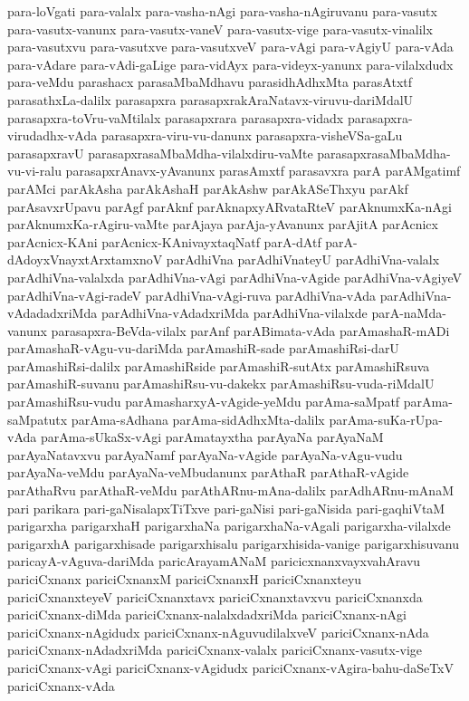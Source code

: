 {para-loVgati
para-valalx
para-vasha-nAgi
para-vasha-nAgiruvanu
para-vasutx
para-vasutx-vanunx
para-vasutx-vaneV
para-vasutx-vige
para-vasutx-vinalilx
para-vasutxvu
para-vasutxve
para-vasutxveV
para-vAgi
para-vAgiyU
para-vAda
para-vAdare
para-vAdi-gaLige
para-vidAyx
para-videyx-yanunx
para-vilalxdudx
para-veMdu
parashacx
parasaMbaMdhavu
parasidhAdhxMta
parasAtxtf
parasathxLa-dalilx
parasapxra
parasapxrakAraNatavx-viruvu-dariMdalU
parasapxra-toVru-vaMtilalx
parasapxrara
parasapxra-vidadx
parasapxra-virudadhx-vAda
parasapxra-viru-vu-danunx
parasapxra-visheVSa-gaLu
parasapxravU
parasapxrasaMbaMdha-vilalxdiru-vaMte
parasapxrasaMbaMdha-vu-vi-ralu
parasapxrAnavx-yAvanunx
parasAmxtf
parasavxra
parA
parAMgatimf
parAMci
parAkAsha
parAkAshaH
parAkAshw
parAkASeThxyu
parAkf
parAsavxrUpavu
parAgf
parAknf
parAknapxyARvataRteV
parAknumxKa-nAgi
parAknumxKa-rAgiru-vaMte
parAjaya
parAja-yAvanunx
parAjitA
parAcnicx
parAcnicx-KAni
parAcnicx-KAnivayxtaqNatf
parA-dAtf
parA-dAdoyxVnayxtArxtamxnoV
parAdhiVna
parAdhiVnateyU
parAdhiVna-valalx
parAdhiVna-valalxda
parAdhiVna-vAgi
parAdhiVna-vAgide
parAdhiVna-vAgiyeV
parAdhiVna-vAgi-radeV
parAdhiVna-vAgi-ruva
parAdhiVna-vAda
parAdhiVna-vAdadadxriMda
parAdhiVna-vAdadxriMda
parAdhiVna-vilalxde
parA-naMda-vanunx
parasapxra-BeVda-vilalx
parAnf
parABimata-vAda
parAmashaR-mADi
parAmashaR-vAgu-vu-dariMda
parAmashiR-sade
parAmashiRsi-darU
parAmashiRsi-dalilx
parAmashiRside
parAmashiR-sutAtx
parAmashiRsuva
parAmashiR-suvanu
parAmashiRsu-vu-dakekx
parAmashiRsu-vuda-riMdalU
parAmashiRsu-vudu
parAmasharxyA-vAgide-yeMdu
parAma-saMpatf
parAma-saMpatutx
parAma-sAdhana
parAma-sidAdhxMta-dalilx
parAma-suKa-rUpa-vAda
parAma-sUkaSx-vAgi
parAmatayxtha
parAyaNa
parAyaNaM
parAyaNatavxvu
parAyaNamf
parAyaNa-vAgide
parAyaNa-vAgu-vudu
parAyaNa-veMdu
parAyaNa-veMbudanunx
parAthaR
parAthaR-vAgide
parAthaRvu
parAthaR-veMdu
parAthARnu-mAna-dalilx
parAdhARnu-mAnaM
pari
parikara
pari-gaNisalapxTiTxve
pari-gaNisi
pari-gaNisida
pari-gaqhiVtaM
parigarxha
parigarxhaH
parigarxhaNa
parigarxhaNa-vAgali
parigarxha-vilalxde
parigarxhA
parigarxhisade
parigarxhisalu
parigarxhisida-vanige
parigarxhisuvanu
paricayA-vAguva-dariMda
paricArayamANaM
paricicxnanxvayxvahAravu
pariciCxnanx
pariciCxnanxM
pariciCxnanxH
pariciCxnanxteyu
pariciCxnanxteyeV
pariciCxnanxtavx
pariciCxnanxtavxvu
pariciCxnanxda
pariciCxnanx-diMda
pariciCxnanx-nalalxdadxriMda
pariciCxnanx-nAgi
pariciCxnanx-nAgidudx
pariciCxnanx-nAguvudilalxveV
pariciCxnanx-nAda
pariciCxnanx-nAdadxriMda
pariciCxnanx-valalx
pariciCxnanx-vasutx-vige
pariciCxnanx-vAgi
pariciCxnanx-vAgidudx
pariciCxnanx-vAgira-bahu-daSeTxV
pariciCxnanx-vAda
}
